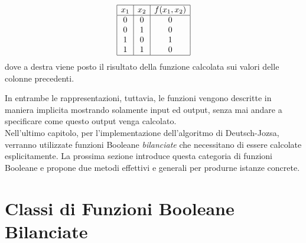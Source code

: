 \documentclass[12pt,a4paper,openright]{report}
\begin{document}
\begin{displaymath}
    \begin{array}{|c|c|c|}\hline
        x_1 & x_2 & f(x_1, x_2) \\\hline 
        0   & 0   &  0  \\ 
        0   & 1   &  0  \\
        1   & 0   &  1  \\
        1   & 1   &  0  \\\hline
    \end{array}
\end{displaymath}
dove a destra viene posto il risultato della funzione calcolata sui valori delle colonne precedenti.\par
In entrambe le rappresentazioni, tuttavia, le funzioni vengono descritte in maniera implicita mostrando solamente input ed output,
senza mai andare a specificare come questo output venga calcolato.\\
Nell'ultimo capitolo, per l'implementazione dell'algoritmo di Deutsch-Jozsa, verranno utilizzate funzioni Booleane \textit{bilanciate}
che necessitano di essere calcolate esplicitamente. La prossima sezione introduce questa categoria di funzioni Booleane e 
propone due metodi effettivi e generali per produrne istanze concrete.

\section{Classi di Funzioni Booleane Bilanciate}
\end{document}
